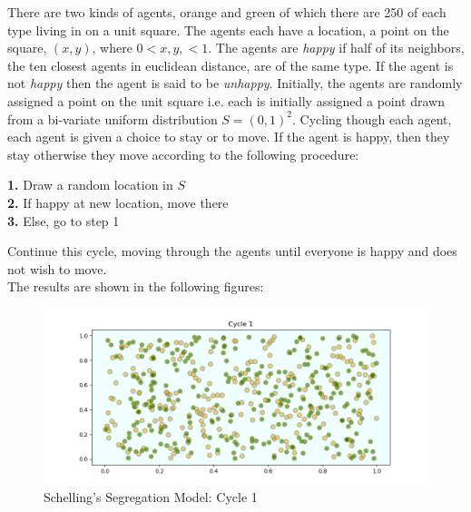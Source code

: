 \documentclass[12pt,twoside]{reedthesis}
\begin{document}
There are two kinds of agents, orange and green of which there are 250 of each type living in on a unit square. The agents each have a location, a point on the square, $(x,y)$, where $0 < x,y,<1$. The agents are \textit{happy} if half of its neighbors, the ten closest agents in euclidean distance, are of the same type. If the agent is not \textit{happy} then the agent is said to be \textit{unhappy}. Initially, the agents are randomly assigned a point on the unit square i.e. each is initially assigned a point drawn from a bi-variate uniform distribution $ S = (0,1)^2$. Cycling though each agent, each agent is given a choice to stay or to move. If the agent is happy, then they stay otherwise they move according to the following procedure:

\begin{adjustwidth}{1cm}{}
	\textbf{1.} Draw a random location in $S$ \\
	\textbf{2.} If happy at new location, move there\\
	\textbf{3.} Else, go to step 1
\end{adjustwidth}

Continue this cycle, moving through the agents until everyone is happy and does not wish to move.\\

The results are shown in the following figures: 

\begin{figure}[h!]
	\centering
	\includegraphics[scale=0.5]{segregation_1}
	\caption{Schelling's Segregation Model: Cycle 1}
	\label{SSM1}
\end{figure}
\end{document}
